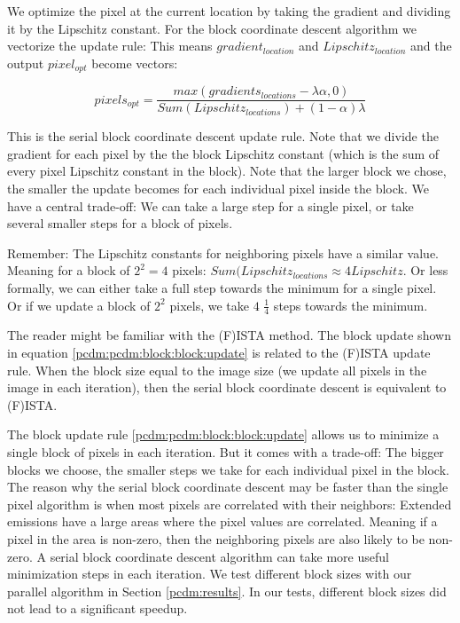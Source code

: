 We optimize the pixel at the current location by taking the gradient and dividing it by the Lipschitz constant. For the block coordinate descent algorithm we vectorize the update rule: This means $gradient_{location}$ and $Lipschitz_{location}$ and the output $pixel_{opt}$ become vectors:

\begin{equation} \label{pcdm:pcdm:block:block:update}
pixels_{opt} = \frac{max(gradients_{locations} - \lambda\alpha, 0)}{Sum(Lipschitz_{locations}) + (1 - \alpha)\lambda}
\end{equation}

This is the serial block coordinate descent update rule. Note that we divide the gradient for each pixel by the the block Lipschitz constant (which is the sum of every pixel Lipschitz constant in the block). Note that the larger block we chose, the smaller the update becomes for each individual pixel inside the block. We have a central trade-off: We can take a large step for a single pixel, or take several smaller steps for a block of pixels. 

Remember: The Lipschitz constants for neighboring pixels have a similar value. Meaning for a block of $2^2 = 4$ pixels: $Sum(Lipschitz_{locations} \approx 4 Lipschitz$. Or less formally, we can either take a full step towards the minimum for a single pixel. Or if we update a block of $2^2$ pixels, we take $4$ $\frac{1}{4}$ steps towards the minimum.

The reader might be familiar with the (F)ISTA method\cite{beck2009fista}. The block update shown in equation \eqref{pcdm:pcdm:block:block:update} is related to the (F)ISTA update rule. When the block size equal to the image size (we update all pixels in the image in each iteration), then the serial block coordinate descent is equivalent to (F)ISTA.

The block update rule \eqref{pcdm:pcdm:block:block:update} allows us to minimize a single block of pixels in each iteration. But it comes with a trade-off: The bigger blocks we choose, the smaller steps we take for each individual pixel in the block. The reason why the serial block coordinate descent may be faster than the single pixel algorithm is when most pixels are correlated with their neighbors: Extended emissions have a large areas where the pixel values are correlated. Meaning if a pixel in the area is non-zero, then the neighboring pixels are also likely to be non-zero. A serial block coordinate descent algorithm can take more useful minimization steps in each iteration. We test different block sizes with our parallel algorithm in Section \ref{pcdm:results}. In our tests, different block sizes did not lead to a significant speedup.


